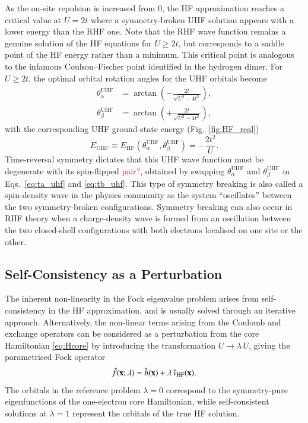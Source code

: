 \documentclass[aps,prb,reprint,noshowkeys,superscriptaddress]{revtex4-1}
\newcommand{\titou}[1]{\textcolor{red}{#1}}
\newcommand{\ta}{\theta_{\alpha}}
\newcommand{\tb}{\theta_{\beta}}
\begin{document}
As the on-site repulsion is increased from 0, the HF approximation reaches a critical value at $U=2t$ where a symmetry-broken 
UHF solution appears with a lower energy than the RHF one.
Note that the RHF wave function remains a genuine solution of the HF equations for $U \ge 2t$, but corresponds to a saddle point 
of the HF energy rather than a minimum.
This critical point is analogous to the infamous Coulson--Fischer point identified in the hydrogen dimer.\cite{Coulson_1949}
For $U \ge 2t$, the optimal orbital rotation angles for the UHF orbitals become
\begin{subequations}
\begin{align}
    \ta^\text{UHF} & = \arctan (-\frac{2t}{\sqrt{U^2 - 4t^2}}),
    \label{eq:ta_uhf}
	\\
    \tb^\text{UHF} & = \arctan (+\frac{2t}{\sqrt{U^2 - 4t^2}}),
    \label{eq:tb_uhf}
\end{align}
\end{subequations}
with the corresponding UHF ground-state energy (Fig.~\ref{fig:HF_real})
\begin{equation}
	E_\text{UHF} \equiv E_\text{HF}(\ta^\text{UHF}, \tb^\text{UHF}) = - \frac{2t^2}{U}.
\end{equation}
Time-reversal symmetry dictates that this UHF wave function must be degenerate with its spin-flipped \titou{pair?}, obtained 
by swapping $\ta^{\text{UHF}}$ and $\tb^{\text{UHF}}$ in Eqs.~\eqref{eq:ta_uhf} and \eqref{eq:tb_uhf}.
This type of symmetry breaking is also called a spin-density wave in the physics community as the system
``oscillates'' between the two symmetry-broken configurations. \cite{GiulianiBook}
Symmetry breaking can also occur in RHF theory when a charge-density wave is formed from an oscillation 
between the two closed-shell configurations with both electrons localised on one site or the other.\cite{StuberPaldus,Fukutome_1981}

\subsection{Self-Consistency as a Perturbation} %

The inherent non-linearity in the Fock eigenvalue problem arises from self-consistency 
in the HF approximation, and is usually solved through an iterative approach.\cite{Roothaan_1951,Hall_1951}
Alternatively, the non-linear terms arising from the Coulomb and exchange operators can 
be considered as a perturbation from the core Hamiltonian \eqref{eq:Hcore} by introducing the
transformation $U \to \lambda\, U$, giving the parametrised Fock operator 
\begin{equation}
    \Hat{f}(\vb{x} ; \lambda) = \Hat{h}(\vb{x}) + \lambda\, \Hat{v}_\text{HF}(\vb{x}).
\end{equation}
The orbitals in the reference problem $\lambda=0$ correspond to the symmetry-pure eigenfunctions of the one-electron core
Hamiltonian, while self-consistent solutions at $\lambda = 1$ represent the orbitals of the true HF solution.
\end{document}
